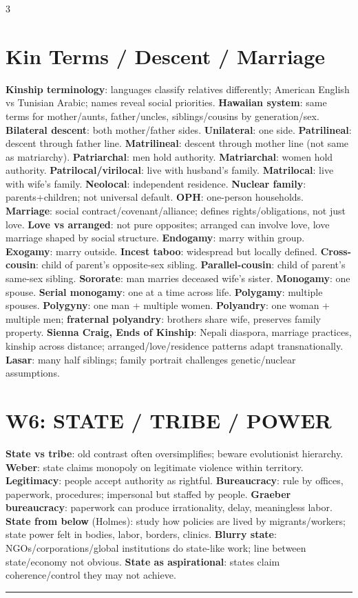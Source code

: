 \documentclass[10pt,landscape]{article}
\newcommand{\kw}[1]{\textbf{#1}}
\newcommand{\sep}{\vspace{0.8pt}\hrule\vspace{0.8pt}}
\begin{document}
\begin{multicols}{3}
\section*{Kin Terms / Descent / Marriage}
\kw{Kinship terminology}: languages classify relatives differently; American English vs Tunisian Arabic; names reveal social priorities. \kw{Hawaiian system}: same terms for mother/aunts, father/uncles, siblings/cousins by generation/sex. \kw{Bilateral descent}: both mother/father sides. \kw{Unilateral}: one side. \kw{Patrilineal}: descent through father line. \kw{Matrilineal}: descent through mother line (not same as matriarchy). \kw{Patriarchal}: men hold authority. \kw{Matriarchal}: women hold authority. \kw{Patrilocal/virilocal}: live with husband's family. \kw{Matrilocal}: live with wife's family. \kw{Neolocal}: independent residence. \kw{Nuclear family}: parents+children; not universal default. \kw{OPH}: one-person households. \kw{Marriage}: social contract/covenant/alliance; defines rights/obligations, not just love. \kw{Love vs arranged}: not pure opposites; arranged can involve love, love marriage shaped by social structure. \kw{Endogamy}: marry within group. \kw{Exogamy}: marry outside. \kw{Incest taboo}: widespread but locally defined. \kw{Cross-cousin}: child of parent's opposite-sex sibling. \kw{Parallel-cousin}: child of parent's same-sex sibling. \kw{Sororate}: man marries deceased wife's sister. \kw{Monogamy}: one spouse. \kw{Serial monogamy}: one at a time across life. \kw{Polygamy}: multiple spouses. \kw{Polygyny}: one man + multiple women. \kw{Polyandry}: one woman + multiple men; \kw{fraternal polyandry}: brothers share wife, preserves family property. \kw{Sienna Craig, Ends of Kinship}: Nepali diaspora, marriage practices, kinship across distance; arranged/love/residence patterns adapt transnationally. \kw{Lasar}: many half siblings; family portrait challenges genetic/nuclear assumptions.

\section*{W6: STATE / TRIBE / POWER}
\kw{State vs tribe}: old contrast often oversimplifies; beware evolutionist hierarchy. \kw{Weber}: state claims monopoly on legitimate violence within territory. \kw{Legitimacy}: people accept authority as rightful. \kw{Bureaucracy}: rule by offices, paperwork, procedures; impersonal but staffed by people. \kw{Graeber bureaucracy}: paperwork can produce irrationality, delay, meaningless labor. \kw{State from below} (Holmes): study how policies are lived by migrants/workers; state power felt in bodies, labor, borders, clinics. \kw{Blurry state}: NGOs/corporations/global institutions do state-like work; line between state/economy not obvious. \kw{State as aspirational}: states claim coherence/control they may not achieve.
\sep

\end{multicols}
\end{document}
